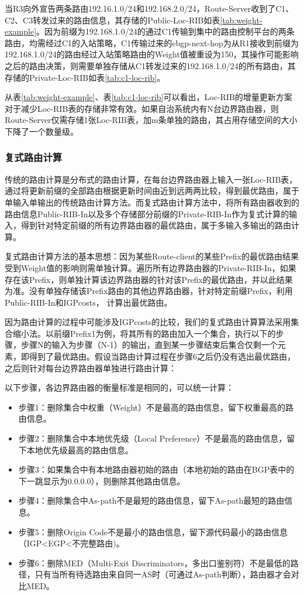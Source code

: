 当R3向外宣告两条路由192.16.1.0/24和192.168.2.0/24，Route-Server收到了C1、C2、C3转发过来的路由信息，其存储的Public-Loc-RIB如表\ref{tab:weight-example}。因为前缀为192.168.1.0/24的通过C1传输到集中的路由控制平台的两条路由，均需经过C1的入站策略，C1传输过来的ebgp-next-hop为从R1接收到前缀为192.168.1.0/24的路由经过入站策略路由的Weight值被重设为150，其操作可能影响之后的路由决策，则需要单独存储从C1转发过来的192.168.1.0/24的所有路由，其存储的Private-Loc-RIB如表\ref{tab:c1-loc-rib}。


从表\ref{tab:weight-example}、表\ref{tab:c1-loc-rib}可以看出，Loc-RIB的增量更新方案对于减少Loc-RIB表的存储非常有效。如果自治系统内有N台边界路由器，则Route-Server仅需存储1张Loc-RIB表，加m条单独的路由，其占用存储空间的大小下降了一个数量级。


\subsubsection{复式路由计算}

传统的路由计算是分布式的路由计算，在每台边界路由器上输入一张Loc-RIB表，通过将更新前缀的全部路由根据更新时间由近到远两两比较，得到最优路由，属于单输入单输出的传统路由计算方法。而复式路由计算方法中，将所有路由器收到的路由信息Public-RIB-In以及多个存储部分前缀的Private-RIB-In作为复式计算的输入，得到针对特定前缀的所有边界路由器的最优路由，属于多输入多输出的路由计算。

复式路由计算方法的基本思想：因为某些Route-client的某些Prefix的最优路由结果受到Weight值的影响则需单独计算。遍历所有边界路由器的Private-RIB-In，如果存在该Prefix，则单独计算该边界路由器的针对该Prefix的最优路由，并以此结果为准。没有单独存储该Prefix路由的其他边界路由器，针对特定前缀Prefix，利用Public-RIB-In和IGPcosts， 计算出最优路由。

因为路由计算的过程中可能涉及IGPcosts的比较，我们的复式路由计算算法采用集合缩小法。以前缀Prefix1为例，将其所有的路由加入一个集合，执行以下的步骤，步骤N的输入为步骤（N-1）的输出，直到某一步骤结束后集合仅剩一个元素，即得到了最优路由。假设当路由计算过程在步骤6之后仍没有选出最优路由，之后则针对每台边界路由器单独进行路由计算：

以下步骤，各边界路由器的衡量标准是相同的，可以统一计算：
\begin{itemize}
    \item 步骤1：删除集合中权重（Weight）不是最高的路由信息，留下权重最高的路由信息。
    \item 步骤2：删除集合中本地优先级（Local Preference）不是最高的路由信息，留下本地优先级最高的路由信息。
    \item 步骤3：如果集合中有本地路由器初始的路由（本地初始的路由在BGP表中的下一跳显示为0.0.0.0），则删除其他路由信息。
    \item 步骤4：删除集合中As-path不是最短的路由信息，留下As-path最短的路由信息。
    \item 步骤5：删除Origin Code不是最小的路由信息，留下源代码最小的路由信息（IGP<EGP<不完整路由)。
    \item 步骤6：删除MED（Multi-Exit Discriminators，多出口鉴别符）不是最低的路径，只有当所有待选路由来自同一AS时（可通过As-path判断），路由器才会对比MED。\\
\end{itemize}


